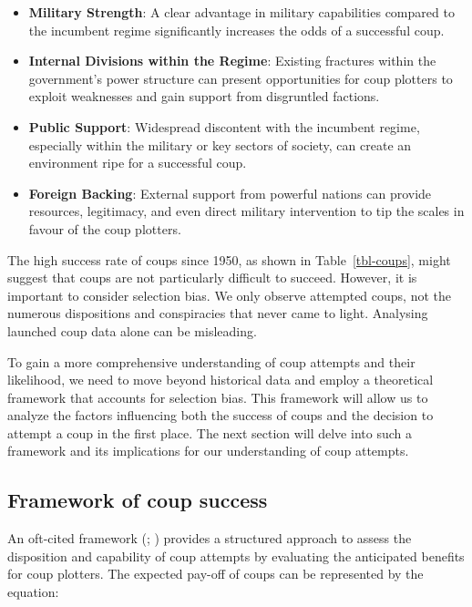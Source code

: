 \documentclass[
  12pt,
]{report}
\begin{document}
\begin{itemize}
\item
  \textbf{Military Strength}: A clear advantage in military capabilities
  compared to the incumbent regime significantly increases the odds of a
  successful coup.
\item
  \textbf{Internal Divisions within the Regime}: Existing fractures
  within the government's power structure can present opportunities for
  coup plotters to exploit weaknesses and gain support from disgruntled
  factions.
\item
  \textbf{Public Support}: Widespread discontent with the incumbent
  regime, especially within the military or key sectors of society, can
  create an environment ripe for a successful coup.
\item
  \textbf{Foreign Backing}: External support from powerful nations can
  provide resources, legitimacy, and even direct military intervention
  to tip the scales in favour of the coup plotters.
\end{itemize}

The high success rate of coups since 1950, as shown in
Table~\ref{tbl-coups}, might suggest that coups are not particularly
difficult to succeed. However, it is important to consider selection
bias. We only observe attempted coups, not the numerous dispositions and
conspiracies that never came to light. Analysing launched coup data
alone can be misleading.

To gain a more comprehensive understanding of coup attempts and their
likelihood, we need to move beyond historical data and employ a
theoretical framework that accounts for selection bias. This framework
will allow us to analyze the factors influencing both the success of
coups and the decision to attempt a coup in the first place. The next
section will delve into such a framework and its implications for our
understanding of coup attempts.

\subsection{Framework of coup success}\label{framework-of-coup-success}

An oft-cited framework (; ) provides a
structured approach to assess the disposition and capability of coup
attempts by evaluating the anticipated benefits for coup plotters. The
expected pay-off of coups can be represented by the equation:
\end{document}
